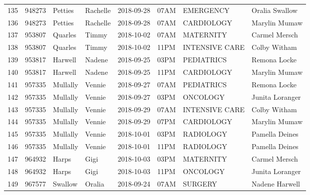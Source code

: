 \documentclass[11pt]{article}
\begin{document}
\begin{tabular}{|l|l|l|l|l|l|l|l|}
	135 &  948273 &   Petties &  Rachelle &      2018-09-28 &  07AM &       EMERGENCY &   Oralia Swallow \\
	136 &  948273 &   Petties &  Rachelle &      2018-09-28 &  07AM &      CARDIOLOGY &    Marylin Mumaw \\
	137 &  953807 &   Quarles &     Timmy &      2018-10-02 &  07AM &       MATERNITY &    Carmel Mersch \\
	138 &  953807 &   Quarles &     Timmy &      2018-10-02 &  11PM &  INTENSIVE CARE &     Colby Witham \\
	139 &  953817 &   Harwell &    Nadene &      2018-09-25 &  03PM &      PEDIATRICS &     Remona Locke \\
	140 &  953817 &   Harwell &    Nadene &      2018-09-25 &  11PM &      CARDIOLOGY &    Marylin Mumaw \\
	141 &  957335 &  Mullally &    Vennie &      2018-09-27 &  07AM &      PEDIATRICS &     Remona Locke \\
	142 &  957335 &  Mullally &    Vennie &      2018-09-27 &  03PM &        ONCOLOGY &  Junita Loranger \\
	143 &  957335 &  Mullally &    Vennie &      2018-09-29 &  07AM &  INTENSIVE CARE &     Colby Witham \\
	144 &  957335 &  Mullally &    Vennie &      2018-09-29 &  07PM &      CARDIOLOGY &    Marylin Mumaw \\
	145 &  957335 &  Mullally &    Vennie &      2018-10-01 &  03PM &       RADIOLOGY &   Pamella Deines \\
	146 &  957335 &  Mullally &    Vennie &      2018-10-01 &  11PM &       RADIOLOGY &   Pamella Deines \\
	147 &  964932 &     Harps &      Gigi &      2018-10-03 &  03PM &       MATERNITY &    Carmel Mersch \\
	148 &  964932 &     Harps &      Gigi &      2018-10-03 &  11PM &        ONCOLOGY &  Junita Loranger \\
	149 &  967577 &   Swallow &    Oralia &      2018-09-24 &  07AM &         SURGERY &   Nadene Harwell \\
	\bottomrule
\end{tabular}

\newpage
\end{document}
